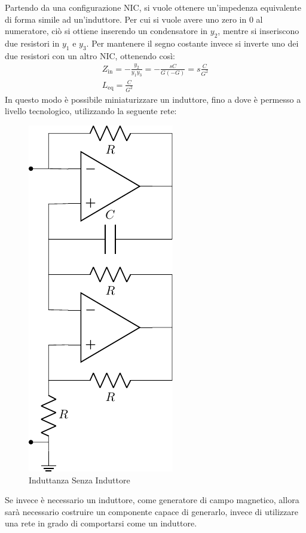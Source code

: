 \documentclass{article}
\numberwithin{equation}{subsection}
\begin{document}
Partendo da una configurazione NIC, si vuole ottenere un'impedenza equivalente di forma simile ad un'induttore. Per cui si vuole avere uno zero 
in $0$ al numeratore, ciò si ottiene inserendo un condensatore in $y_2$, mentre si inseriscono due resistori in $y_1$ e $y_3$. Per mantenere il 
segno costante invece si inverte uno dei due resistori con un altro NIC, ottenendo così:
\begin{gather*}
    Z_\mathrm{in}=-\displaystyle\frac{y_2}{y_1y_3}=-\frac{sC}{G(-G)}=s\frac{C}{G^2}\\
    L_\mathrm{eq}=\displaystyle\frac{C}{G^2}
\end{gather*}
In questo modo è possibile miniaturizzare un induttore, fino a dove è permesso a livello tecnologico, utilizzando la seguente rete:
\begin{figure}[H]%
    \centering
    \includegraphics{amplificatore-induttore-nic.pdf}%
    \caption{Induttanza Senza Induttore}
    \label{fig:amplificatore-induttore-nic}
\end{figure}

Se invece è necessario un induttore, come generatore di campo magnetico, allora sarà necessario costruire un componente capace di generarlo, invece 
di utilizzare una rete in grado di comportarsi come un induttore. 
\end{document}
